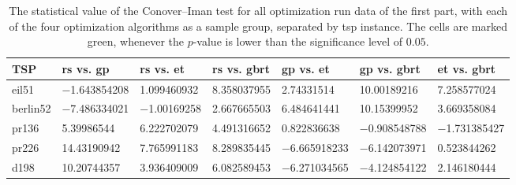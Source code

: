\begin{table}[h]
	\centering
	\caption[The $p$-value of the Conover–Iman test for all optimization run data of the first part]{The statistical value of the Conover–Iman test for all optimization run data of the first part, with each of the four optimization algorithms as a sample group, separated by \gls{tsp} instance. The cells are marked green, whenever the $p$-value is lower than the significance level of $0.05$.}
	\label{tab:conover-t}
	
	\begin{adjustbox}{width=1\textwidth}
	\begin{tabular}{ l | l  l  l  l  l  l}
		\hline
		TSP & \gls{rs} vs. \gls{gp} & \gls{rs} vs. \gls{et} & \gls{rs} vs. \gls{gbrt} & \gls{gp} vs. \gls{et} & \gls{gp} vs. \gls{gbrt} & \gls{et} vs. \gls{gbrt} \\ \hline
		eil51 & \num{-1,643854208} & \num{1,099460932} & \cellcolor{green!25} \num{8,358037955} & \cellcolor{green!25} \num{2,74331514} & \cellcolor{green!25} \num{10,00189216} & \cellcolor{green!25} \num{7,258577024} \\
		berlin52 & \cellcolor{green!25} \num{-7,486334021} & \num{-1,00169258} & \num{2,667665503} & \cellcolor{green!25} \num{6,484641441} & \cellcolor{green!25} \num{10,15399952} & \cellcolor{green!25} \num{3,669358084} \\ 
		pr136 & \cellcolor{green!25} \num{5,39986544} & \cellcolor{green!25} \num{6,222702079} & \cellcolor{green!25} \num{4,491316652} & \num{0,822836638} & \num{-0,908548788} & \num{-1,731385427} \\ 
    	pr226 & \cellcolor{green!25} \num{14,43190942} & \cellcolor{green!25} \num{7,765991183} & \cellcolor{green!25} \num{8,289835445} & \cellcolor{green!25} \num{-6,665918233} & \cellcolor{green!25} \num{-6,142073971} & \num{0,523844262} \\ 
    	d198 & \cellcolor{green!25} \num{10,20744357} & \cellcolor{green!25} \num{3,936409009} & \cellcolor{green!25} \num{6,082589453} & \cellcolor{green!25} \num{-6,271034565} & \cellcolor{green!25} \num{-4,124854122} & \num{2,146180444} \\ \hline
	\end{tabular}
	\end{adjustbox}
\end{table}

